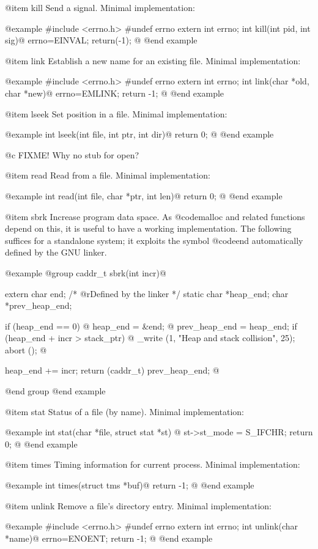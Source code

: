 @item kill
Send a signal.  Minimal implementation:

@example
#include <errno.h>
#undef errno
extern int errno;
int kill(int pid, int sig)@{
  errno=EINVAL;
  return(-1);
@}
@end example

@item link
Establish a new name for an existing file.  Minimal implementation:

@example
#include <errno.h>
#undef errno
extern int errno;
int link(char *old, char *new)@{
  errno=EMLINK;
  return -1;
@}
@end example

@item lseek
Set position in a file.  Minimal implementation:

@example
int lseek(int file, int ptr, int dir)@{
    return 0;
@}
@end example

@c FIXME! Why no stub for open?

@item read
Read from a file.  Minimal implementation:

@example
int read(int file, char *ptr, int len)@{
    return 0;
@}
@end example

@item sbrk
Increase program data space.  As @code{malloc} and related functions
depend on this, it is useful to have a working implementation.  The
following suffices for a standalone system; it exploits the symbol
@code{end} automatically defined by the GNU linker.

@example
@group
caddr_t sbrk(int incr)@{
  extern char end;		/* @r{Defined by the linker} */
  static char *heap_end;
  char *prev_heap_end;
 
  if (heap_end == 0) @{
    heap_end = &end;
  @}
  prev_heap_end = heap_end;
  if (heap_end + incr > stack_ptr)
    @{
      _write (1, "Heap and stack collision\n", 25);
      abort ();
    @}

  heap_end += incr;
  return (caddr_t) prev_heap_end;
@}
@end group
@end example

@item stat
Status of a file (by name).  Minimal implementation:

@example
int stat(char *file, struct stat *st) @{
  st->st_mode = S_IFCHR;
  return 0;
@}
@end example

@item times
Timing information for current process.  Minimal implementation:

@example
int times(struct tms *buf)@{
  return -1;
@}
@end example

@item unlink
Remove a file's directory entry.  Minimal implementation:

@example
#include <errno.h>
#undef errno
extern int errno;
int unlink(char *name)@{
  errno=ENOENT;
  return -1; 
@}
@end example

